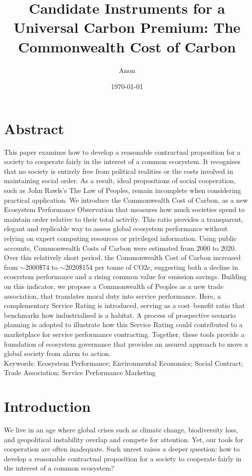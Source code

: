 \documentclass[10pt, oneside]{article}   	%
\title{Candidate Instruments for a Universal Carbon Premium: The Commonwealth Cost of Carbon}
\author{Anon}
\date{\today}
\begin{document}
\maketitle

\section{Abstract}
This paper examines how to develop a reasonable contractual proposition for a society to cooperate fairly in the interest of a common ecosystem.
It recognises that no society is entirely free from political realities or the costs involved in maintaining social order.
As a result, ideal propositions of social cooperation, such as John Rawls’s The Law of Peoples, remain incomplete when considering practical application.
We introduce the Commonwealth Cost of Carbon, as a new Ecosystem Performance Observation that measures how much societies spend to maintain order relative to their total activity.
This ratio provides a transparent, elegant and replicable way to assess global ecosystem performance without relying on expert computing resources or privileged information.
Using public accounts, Commonwealth Costs of Carbon were estimated from 2000 to 2020.
Over this relatively short period, the Commonwealth Cost of Carbon increased from $\sim$2000\$74 to $\sim$2020\$154 per tonne of CO2e, suggesting both a decline in ecosystem performance and a rising common value for emission savings.
Building on this indicator, we propose a Commonwealth of Peoples as a new trade association, that translates moral duty into service performance.
Here, a complementary Service Rating is introduced, serving as a cost–benefit ratio that benchmarks how industrialised is a habitat.
A process of prospective scenario planning is adopted to illustrate how this Service Rating could contributed to a marketplace for service performance contracting.
Together, these tools provide a foundation of ecosystem governance that provides an assured approach to move a global society from alarm to action.\\

Keywords: Ecosystem Performance; Environmental Economics; Social Contract; Trade Association; Service Performance Marketing\\

\section{Introduction}

We live in an age where global crises such as climate change, biodiversity loss, and geopolitical instability overlap and compete for attention.
Yet, our tools for cooperation are often inadequate.
Such unrest raises a deeper question: how to develop a reasonable contractual proposition for a society to cooperate fairly in the interest of a common ecosystem?\\
\end{document}
